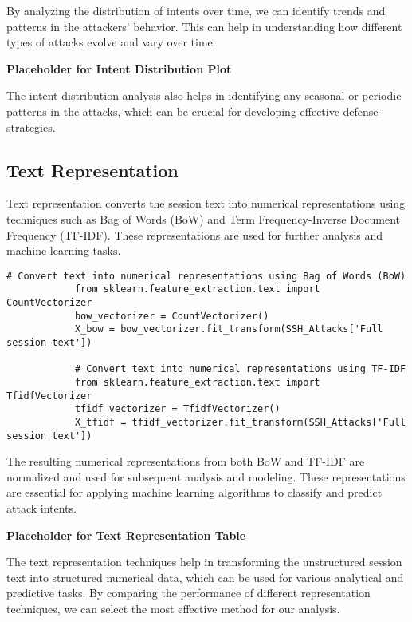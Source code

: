         By analyzing the distribution of intents over time, we can identify trends and patterns in the attackers' behavior. This can help in understanding how different types of attacks evolve and vary over time.

        \textbf{Placeholder for Intent Distribution Plot}

        The intent distribution analysis also helps in identifying any seasonal or periodic patterns in the attacks, which can be crucial for developing effective defense strategies.

    \subsection{Text Representation}
    
        Text representation converts the session text into numerical representations using techniques such as Bag of Words (BoW) and Term Frequency-Inverse Document Frequency (TF-IDF). These representations are used for further analysis and machine learning tasks.

        \begin{lstlisting}[caption={Convert text into numerical representations}, label={lst:convert-text-numerical}]
            # Convert text into numerical representations using Bag of Words (BoW)
            from sklearn.feature_extraction.text import CountVectorizer
            bow_vectorizer = CountVectorizer()
            X_bow = bow_vectorizer.fit_transform(SSH_Attacks['Full session text'])

            # Convert text into numerical representations using TF-IDF
            from sklearn.feature_extraction.text import TfidfVectorizer
            tfidf_vectorizer = TfidfVectorizer()
            X_tfidf = tfidf_vectorizer.fit_transform(SSH_Attacks['Full session text'])
        \end{lstlisting}
        
        \vspace{1em}

        The resulting numerical representations from both BoW and TF-IDF are normalized and used for subsequent analysis and modeling. These representations are essential for applying machine learning algorithms to classify and predict attack intents.

        \textbf{Placeholder for Text Representation Table}

        The text representation techniques help in transforming the unstructured session text into structured numerical data, which can be used for various analytical and predictive tasks. By comparing the performance of different representation techniques, we can select the most effective method for our analysis.
